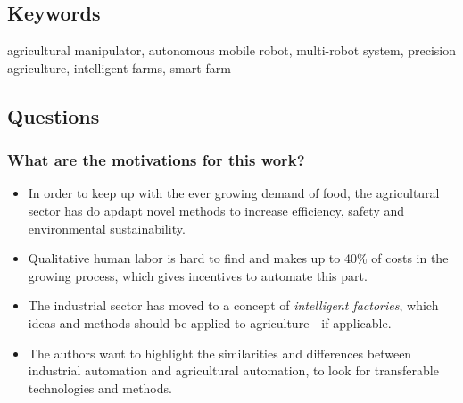 \documentclass{article}
\begin{document}
\subsection*{Keywords}
agricultural manipulator, autonomous mobile robot, multi-robot system, precision agriculture, intelligent farms, smart farm

\subsection*{Questions}
\subsubsection*{What are the motivations for this work?}
\begin{itemize}
    \item In order to keep up with the ever growing demand of food, the agricultural sector has do apdapt novel methods to increase efficiency, safety and environmental sustainability.
    \item Qualitative human labor is hard to find and makes up to 40\% of costs in the growing process, which gives incentives to automate this part.
    \item The industrial sector has moved to a concept of \emph{intelligent factories}, which ideas and methods should be applied to agriculture - if applicable.
    \item The authors want to highlight the similarities and differences between industrial automation and agricultural automation, to look for transferable technologies and methods.\end{itemize}
\end{document}
